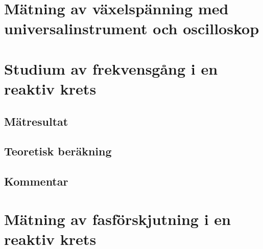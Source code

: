 \documentclass[11pt,a4paper]{article}
\begin{document}
\section{Mätning av växelspänning med universalinstrument och oscilloskop}\label{}


\section{Studium av frekvensgång i en reaktiv krets}\label{}

\subsection{Mätresultat}\label{}

\subsection{Teoretisk beräkning}\label{}

\subsection{Kommentar}\label{}


\section{Mätning av fasförskjutning i en reaktiv krets}\label{}
\end{document}
